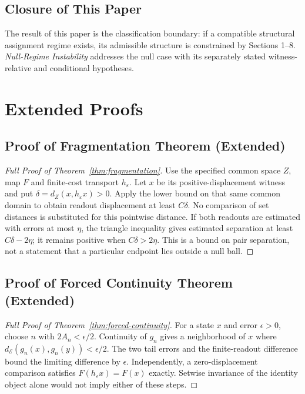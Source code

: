 \documentclass[11pt,a4paper]{article}
\theoremstyle{plain}
\theoremstyle{definition}
\theoremstyle{remark}
\begin{document}
\subsection{Closure of This Paper}

The result of this paper is the classification boundary: if a compatible structural assignment regime exists, its admissible structure is constrained by Sections 1--8. \textit{Null-Regime Instability} addresses the null case with its separately stated witness-relative and conditional hypotheses.

\appendix
\section{Extended Proofs}\label{app:extended-classification-proofs}

\subsection{Proof of Fragmentation Theorem (Extended)}

\begin{proof}[Full Proof of Theorem~\ref{thm:fragmentation}]
Use the specified common space $Z$, map $F$ and finite-cost transport $h_\varepsilon$. Let $x$ be its positive-displacement witness and put $\delta=d_Z(x,h_\varepsilon x)>0$. Apply the lower bound on that same common domain to obtain readout displacement at least $C\delta$. No comparison of set distances is substituted for this pointwise distance. If both readouts are estimated with errors at most $\eta$, the triangle inequality gives estimated separation at least $C\delta-2\eta$; it remains positive when $C\delta>2\eta$. This is a bound on pair separation, not a statement that a particular endpoint lies outside a null ball.
\end{proof}

\subsection{Proof of Forced Continuity Theorem (Extended)}

\begin{proof}[Full Proof of Theorem~\ref{thm:forced-continuity}]
For a state $x$ and error $\epsilon>0$, choose $n$ with $2A_n<\epsilon/2$. Continuity of $g_n$ gives a neighborhood of $x$ where $d_{\mathcal E}(g_n(x),g_n(y))<\epsilon/2$. The two tail errors and the finite-readout difference bound the limiting difference by $\epsilon$. Independently, a zero-displacement comparison satisfies $F(h_\varepsilon x)=F(x)$ exactly. Setwise invariance of the identity object alone would not imply either of these steps.
\end{proof}
\end{document}

